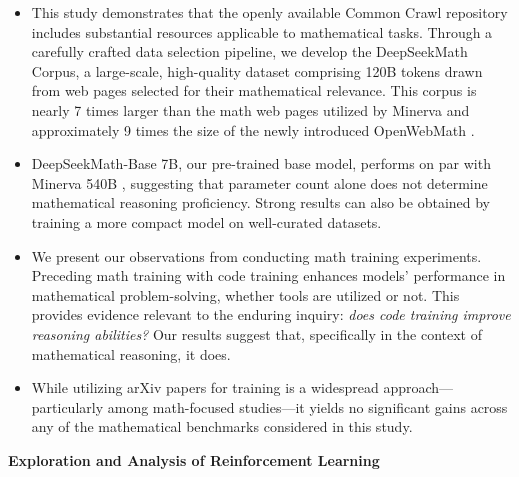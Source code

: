 \begin{itemize}[topsep=0pt]
    \item This study demonstrates that the openly available Common Crawl repository includes substantial resources applicable to mathematical tasks. Through a carefully crafted data selection pipeline, we develop the DeepSeekMath Corpus, a large-scale, high-quality dataset comprising 120B tokens drawn from web pages selected for their mathematical relevance. This corpus is nearly 7 times larger than the math web pages utilized by Minerva \citep{minerva} and approximately 9 times the size of the newly introduced OpenWebMath \citep{openwebmath}.

\item DeepSeekMath-Base 7B, our pre-trained base model, performs on par with Minerva 540B \citep{minerva}, suggesting that parameter count alone does not determine mathematical reasoning proficiency. Strong results can also be obtained by training a more compact model on well-curated datasets.

\item We present our observations from conducting math training experiments. Preceding math training with code training enhances models' performance in mathematical problem-solving, whether tools are utilized or not. This provides evidence relevant to the enduring inquiry: \textit{does code training improve reasoning abilities?} Our results suggest that, specifically in the context of mathematical reasoning, it does.

\item While utilizing arXiv papers for training is a widespread approach—particularly among math-focused studies—it yields no significant gains across any of the mathematical benchmarks considered in this study.
\end{itemize}

\textbf{Exploration and Analysis of Reinforcement Learning}

